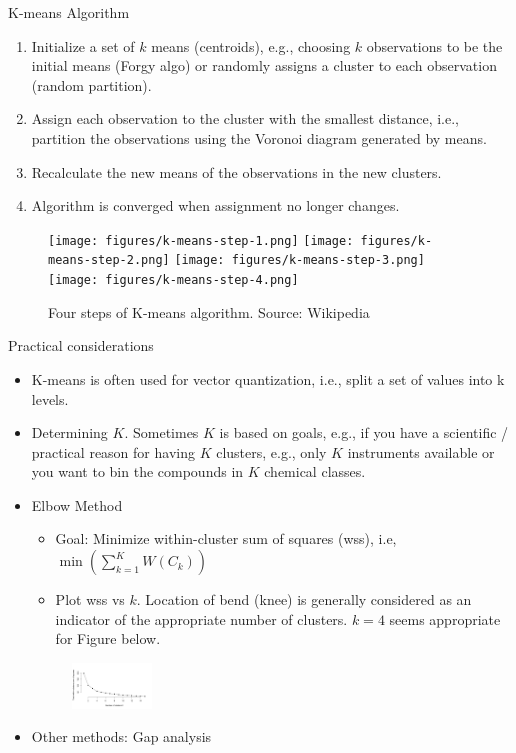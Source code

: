 \documentclass[aspectratio=169]{beamer}
\begin{document}
\begin{frame}{K-means Algorithm}
    \begin{enumerate}
            \item Initialize a set of $k$ means (centroids), e.g., choosing $k$ observations to be the initial means (Forgy algo) or randomly assigns a cluster to each observation (random partition).
            \item Assign each observation to the cluster with the smallest distance, i.e., partition the observations using the Voronoi diagram generated by means.
            \item Recalculate the new means of the observations in the new clusters.
            \item Algorithm is converged when assignment no longer changes.
        \end{enumerate}
        \begin{figure}
            \texttt{[image: figures/k-means-step-1.png]}
            \texttt{[image: figures/k-means-step-2.png]}
            \texttt{[image: figures/k-means-step-3.png]}
            \texttt{[image: figures/k-means-step-4.png]}
            \caption{Four steps of K-means algorithm. Source: Wikipedia}
        \end{figure}
\end{frame} 


\begin{frame}{Practical considerations}
    \begin{itemize}
        \item K-means is often used for vector quantization, i.e., split a set of values into k levels.
        \item Determining $K$. Sometimes $K$ is based on goals, e.g., if you have a scientific / practical reason for having $K$ clusters, e.g., only $K$ instruments available or you want to bin the compounds in $K$ chemical classes.
        \item Elbow Method
        \begin{itemize}
            \item Goal: Minimize within-cluster sum of squares (wss), i.e,  $\min(\sum_{k=1}^KW(C_k))$
            \item Plot wss vs $k$. Location of bend (knee) is generally considered as an indicator of the appropriate number of clusters. $k=4$ seems appropriate for Figure below.
        \end{itemize}
        \begin{figure}
            \centering
            \includegraphics[width=0.2\textwidth]{figures/elbow_detection.png}
        \end{figure}
        \item Other methods: Gap analysis
    \end{itemize}
\end{frame}
\end{document}
